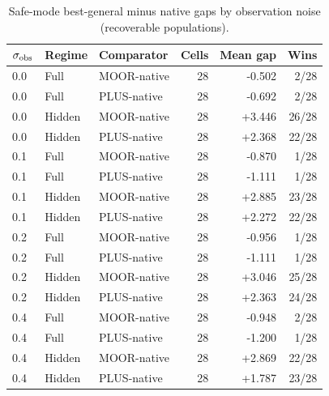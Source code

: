 \begin{table}[htbp]
\centering
\caption{Safe-mode best-general minus native gaps by observation noise (recoverable populations).}
\label{tab:sigma}
\begin{tabular}{lllrrr}
\toprule
$\sigma_{\rm obs}$ & Regime & Comparator & Cells & Mean gap & Wins \\
\midrule
0.0 & Full & MOOR-native & 28 & -0.502 & 2/28 \\
0.0 & Full & PLUS-native & 28 & -0.692 & 2/28 \\
0.0 & Hidden & MOOR-native & 28 & +3.446 & 26/28 \\
0.0 & Hidden & PLUS-native & 28 & +2.368 & 22/28 \\
0.1 & Full & MOOR-native & 28 & -0.870 & 1/28 \\
0.1 & Full & PLUS-native & 28 & -1.111 & 1/28 \\
0.1 & Hidden & MOOR-native & 28 & +2.885 & 23/28 \\
0.1 & Hidden & PLUS-native & 28 & +2.272 & 22/28 \\
0.2 & Full & MOOR-native & 28 & -0.956 & 1/28 \\
0.2 & Full & PLUS-native & 28 & -1.111 & 1/28 \\
0.2 & Hidden & MOOR-native & 28 & +3.046 & 25/28 \\
0.2 & Hidden & PLUS-native & 28 & +2.363 & 24/28 \\
0.4 & Full & MOOR-native & 28 & -0.948 & 2/28 \\
0.4 & Full & PLUS-native & 28 & -1.200 & 1/28 \\
0.4 & Hidden & MOOR-native & 28 & +2.869 & 22/28 \\
0.4 & Hidden & PLUS-native & 28 & +1.787 & 23/28 \\
\bottomrule
\end{tabular}
\end{table}
